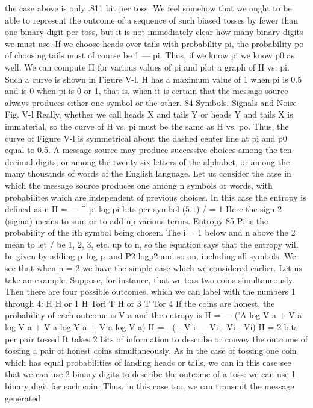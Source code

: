 the case above is only .811 bit per toss. We feel somehow that we
ought to be able to represent the outcome of a sequence of such
biased tosses by fewer than one binary digit per toss, but it is not
immediately clear how many binary digits we must use.
If we choose heads over tails with probability pi, the probability
po of choosing tails must of course be 1 — pi. Thus, if we know pi
we know p0 as well. We can compute H for various values of pi
and plot a graph of H vs. pi. Such a curve is shown in Figure V-l.
H has a maximum value of 1 when pi is 0.5 and is 0 when pi is 0
or 1, that is, when it is certain that the message source always
produces either one symbol or the other.
84 Symbols, Signals and Noise
Fig. V-l
Really, whether we call heads X and tails Y or heads Y and tails
X is immaterial, so the curve of H vs. pi must be the same as H
vs. po. Thus, the curve of Figure V-l is symmetrical about the
dashed center line at pi and p0 equal to 0.5.
A message source may produce successive choices among the
ten decimal digits, or among the twenty-six letters of the alphabet,
or among the many thousands of words of the English language.
Let us consider the case in which the message source produces one
among n symbols or words, with probabilites which are independent
of previous choices. In this case the entropy is defined as
n
H = — ^ pi log pi bits per symbol (5.1)
/ = 1
Here the sign 2 (sigma) means to sum or to add up various terms.
Entropy 85
Pi is the probability of the ith symbol being chosen. The i = 1 below
and n above the 2 mean to let / be 1, 2, 3, etc. up to n, so the equation
says that the entropy will be given by adding p\ log p\ and
P2 logp2 and so on, including all symbols. We see that when n = 2
we have the simple case which we considered earlier.
Let us take an example. Suppose, for instance, that we toss two
coins simultaneously. Then there are four possible outcomes, which
we can label with the numbers 1 through 4:
H H or 1
H Tori
T H or 3
T Tor 4
If the coins are honest, the probability of each outcome is V a and
the entropy is
H = — ('A log V a + V a log V a + V a log Y a + V a log V a)
H = - ( - V i — Vi - Vi - Vi)
H = 2 bits per pair tossed
It takes 2 bits of information to describe or convey the outcome
of tossing a pair of honest coins simultaneously. As in the case of
tossing one coin which has equal probabilities of landing heads or
tails, we can in this case see that we can use 2 binary digits to
describe the outcome of a toss: we can use 1 binary digit for each
coin. Thus, in this case too, we can transmit the message generated
